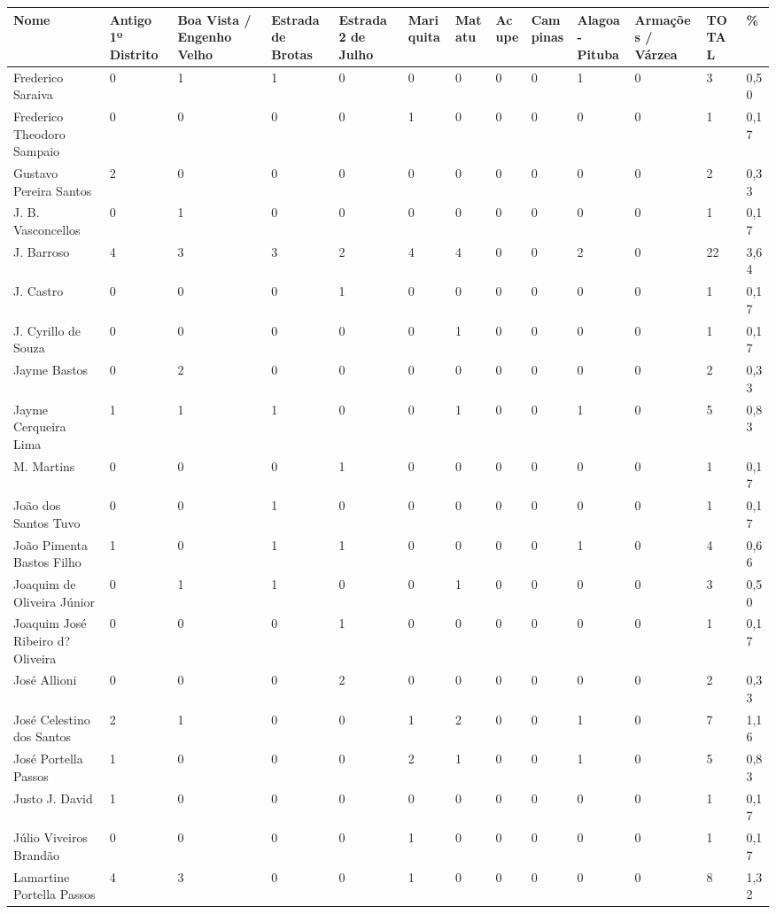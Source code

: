 \begin{table}[!htp]
{
\begin{tabular}{lllllllllllll}
\toprule
Nome	&Antigo 1º Distrito	&Boa Vista / Engenho Velho	&Estrada de Brotas	&Estrada 2 de Julho	&Mariquita	&Matatu	&Acupe	&Campinas	&Alagoa-Pituba	&Armações / Várzea	&TOTAL	&\%\\
\midrule
\midrule
Frederico Saraiva	&0	&1	&1	&0	&0	&0	&0	&0	&1	&0	&3	&0,50\\
Frederico Theodoro Sampaio	&0	&0	&0	&0	&1	&0	&0	&0	&0	&0	&1	&0,17\\
Gustavo Pereira Santos	&2	&0	&0	&0	&0	&0	&0	&0	&0	&0	&2	&0,33\\
J. B. Vasconcellos	&0	&1	&0	&0	&0	&0	&0	&0	&0	&0	&1	&0,17\\
J. Barroso	&4	&3	&3	&2	&4	&4	&0	&0	&2	&0	&22	&3,64\\
J. Castro	&0	&0	&0	&1	&0	&0	&0	&0	&0	&0	&1	&0,17\\
J. Cyrillo de Souza	&0	&0	&0	&0	&0	&1	&0	&0	&0	&0	&1	&0,17\\
Jayme Bastos	&0	&2	&0	&0	&0	&0	&0	&0	&0	&0	&2	&0,33\\
Jayme Cerqueira Lima	&1	&1	&1	&0	&0	&1	&0	&0	&1	&0	&5	&0,83\\
M. Martins	&0	&0	&0	&1	&0	&0	&0	&0	&0	&0	&1	&0,17\\
João dos Santos Tuvo	&0	&0	&1	&0	&0	&0	&0	&0	&0	&0	&1	&0,17\\
João Pimenta Bastos Filho	&1	&0	&1	&1	&0	&0	&0	&0	&1	&0	&4	&0,66\\
Joaquim de Oliveira Júnior	&0	&1	&1	&0	&0	&1	&0	&0	&0	&0	&3	&0,50\\
Joaquim José Ribeiro d?Oliveira	&0	&0	&0	&1	&0	&0	&0	&0	&0	&0	&1	&0,17\\
José Allioni	&0	&0	&0	&2	&0	&0	&0	&0	&0	&0	&2	&0,33\\
José Celestino dos Santos	&2	&1	&0	&0	&1	&2	&0	&0	&1	&0	&7	&1,16\\
José Portella Passos	&1	&0	&0	&0	&2	&1	&0	&0	&1	&0	&5	&0,83\\
Justo J. David	&1	&0	&0	&0	&0	&0	&0	&0	&0	&0	&1	&0,17\\
Júlio Viveiros Brandão	&0	&0	&0	&0	&1	&0	&0	&0	&0	&0	&1	&0,17\\
Lamartine Portella Passos	&4	&3	&0	&0	&1	&0	&0	&0	&0	&0	&8	&1,32\\

\end{tabular}}
\end{table}
